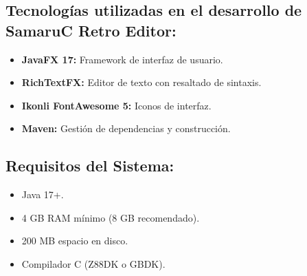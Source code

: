 \documentclass[../../main.tex]{subfiles}
\begin{document}
\subsection{Tecnologías utilizadas en el desarrollo de SamaruC Retro Editor:}
\begin{itemize}
    \item \textbf{JavaFX 17:} Framework de interfaz de usuario.
    \item \textbf{RichTextFX:} Editor de texto con resaltado de sintaxis.
    \item \textbf{Ikonli FontAwesome 5:} Iconos de interfaz.
    \item \textbf{Maven:} Gestión de dependencias y construcción.
\end{itemize}
\clearpage

\subsection{Requisitos del Sistema:}
\begin{itemize}
    \item Java 17+.
    \item 4 GB RAM mínimo (8 GB recomendado).
    \item 200 MB espacio en disco.
    \item Compilador C (Z88DK o GBDK).
\end{itemize}
\end{document}
